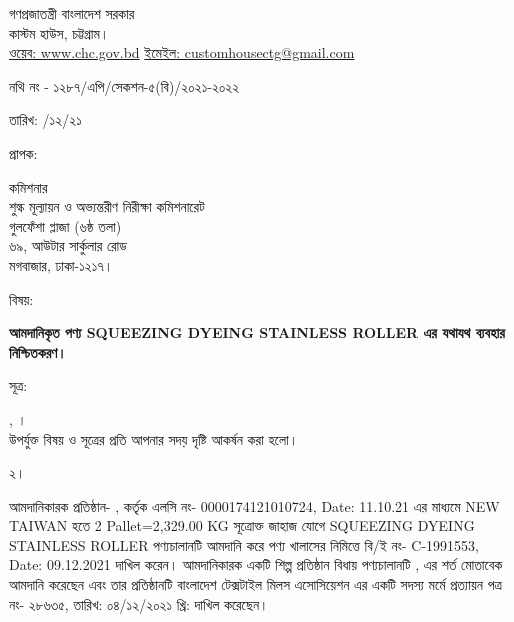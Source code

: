 \documentclass[12pt]{article}
\newcommand{\fileno}{নথি নং - ১২৮৭/এপি/সেকশন-৫(বি)/২০২১-২০২২}
\newcommand{\fdt}{\hspace*{3em} তারিখ: \hspace{2.4em} /১২/২১}
\newcommand{\good}{SQUEEZING DYEING STAINLESS ROLLER}
\newcommand{\pkg}{2 Pallet=2,329.00 KG}
\newcommand{\co}{NEW TAIWAN}
\newcommand{\beno}{C-1991553}
\newcommand{\bedt}{09.12.2021}
\newcommand{\lcno}{0000174121010724}
\newcommand{\lcdt}{11.10.21}
\newcommand{\impn}{\jdwl}
\newcommand{\impadd}{\jdwla}
\newcommand{\btmaltno}{পত্র নং- ২৮৬৩৫}
\newcommand{\btmaltnodt}{তারিখ:  ০৪/১২/২০২১ খ্রি:}
\begin{document}
\newpage
\begin{center}
\vspace*{6MM}
গণপ্রজাতন্ত্রী বাংলাদেশ সরকার
\\
\footnotesize{কাস্টম হাউস, চট্টগ্রাম।}
\\
\href{}{ওয়েব: www.chc.gov.bd}\hspace{1em}
\href{}{ইমেইল: customhousectg@gmail.com}
\end{center}
\normalsize
\begin{minipage}[t]{.74\linewidth}
{\fileno}
\end{minipage}
\begin{minipage}[t]{.26\linewidth}
{\fdt}
\\
\end{minipage}
\begin{minipage}[t]{.07\linewidth}
প্রাপক:
\end{minipage}
\begin{minipage}[t]{.93\linewidth}
কমিশনার
\\
শুল্ক মূল্যায়ন ও অভ্যন্তরীণ নিরীক্ষা কমিশনারেট
\\
গুলফেঁশা প্লাজা (৬ষ্ঠ তলা)
\\
৬৯, আউটার সার্কুলার রোড
\\
মগবাজার, ঢাকা-১২১৭।
\\
\end{minipage}
\begin{minipage}[t]{.07\linewidth}
বিষয়:
\end{minipage}
\begin{minipage}[t]{.93\linewidth}
\textbf{আমদানিকৃত পণ্য {\good} এর যথাযথ ব্যবহার নিশ্চিতকরণ।}
\end{minipage}
\begin{minipage}[t]{.07\linewidth}
সূত্র:
\end{minipage}
\begin{minipage}[t]{.93\linewidth}
{\srooot}, {\sroootd}।
\\
উপর্যুক্ত বিষয় ও সূত্রের প্রতি আপনার সদয় দৃষ্টি
আকর্ষন করা হলো।
\\
\end{minipage}
\begin{minipage}[t]{.07\linewidth}
২।
\end{minipage}
\begin{minipage}[t]{.93\linewidth}
আমদানিকারক প্রতিষ্ঠান- {\impn}, {\impadd}
কর্তৃক এলসি নং- {\lcno}, Date: {\lcdt}
এর মাধ্যমে {\co} হতে
{\pkg} সূত্রোক্ত জাহাজ যোগে {\good}
পণ্যচালানটি আমদানি করে পণ্য
খালাসের নিমিত্তে বি/ই নং- {\beno}, Date: {\bedt}
দাখিল করেন। আমদানিকারক একটি
শিল্প প্রতিষ্ঠান বিধায় পণ্যচালানটি
{\srooot}, {\sroootd}
এর শর্ত মোতাবেক আমদানি করেছেন এবং
তার প্রতিষ্ঠানটি বাংলাদেশ টেক্সটাইল মিলস
এসোসিয়েশন এর একটি সদস্য মর্মে প্রত্যায়ন
{\btmaltno}, {\btmaltnodt}
দাখিল করেছেন।
\\
\end{minipage}
\end{document}
